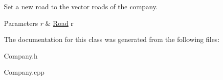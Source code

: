 Set a new road to the vector roads of the company. 


\begin{DoxyParams}{Parameters}
{\em r} & \hyperlink{class_road}{Road} r \\
\hline
\end{DoxyParams}


The documentation for this class was generated from the following files\+:\begin{DoxyCompactItemize}
\item 
Company.\+h\item 
Company.\+cpp\end{DoxyCompactItemize}
